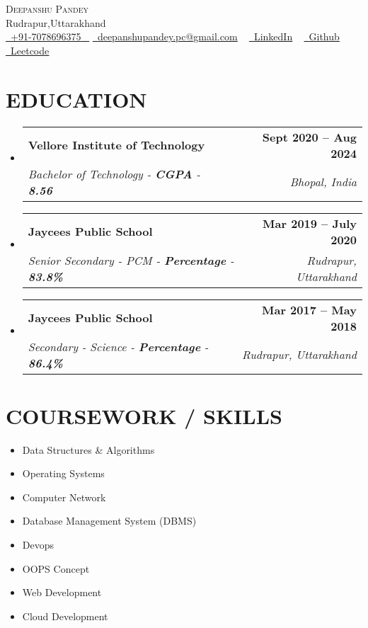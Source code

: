 \documentclass[letterpaper,11pt]{article}
\makeatletter
\newcommand{\resumeSubheading}[4]{
  \vspace{-2pt}\item
    \begin{tabular*}{1.0\textwidth}[t]{l@{\extracolsep{\fill}}r}
      \textbf{\large#1} & \textbf{\small #2} \\
      \textit{\large#3} & \textit{\small #4} \\
      
    \end{tabular*}\vspace{-7pt}
}
\newcommand{\resumeSubHeadingListStart}{\begin{itemize}[leftmargin=0.0in, label={}]}
\newcommand{\resumeSubHeadingListEnd}{\end{itemize}}
\makeatother
\begin{document}


\begin{center}
    {\Huge \scshape Deepanshu Pandey} \\ \vspace{1pt}
    Rudrapur,Uttarakhand \\ \vspace{1pt}
    \small \href{tel:+xxxxxxxxxxxx}{ \raisebox{-0.1\height}\faPhone\ \underline{+91-7078696375} ~} \href{mailto:deepanshupandey.pc@gmail.com}{\raisebox{-0.2\height}\faEnvelope\  \underline{deepanshupandey.pc@gmail.com}} ~ 
    \href{https://www.linkedin.com/in/deepanshupandey-/}{\raisebox{-0.2\height}\faLinkedinSquare\ \underline{LinkedIn}}  ~
    \href{https://github.com/deepanshu-byte}{\raisebox{-0.2\height}\faGithub\ \underline{Github}} ~
    \href{https://leetcode.com/deepanshu_pandey/}{\raisebox{-0.2\height}\faCode\ \underline{Leetcode}}
    \vspace{-8pt}
\end{center}


\section{EDUCATION}
  \resumeSubHeadingListStart
    \resumeSubheading
      {Vellore Institute of Technology}{Sept 2020 -- Aug 2024}
      {Bachelor of Technology - \textbf{CGPA} - \textbf{8.56}}{Bhopal, India}
  \resumeSubHeadingListEnd
  
  \resumeSubHeadingListStart
    \resumeSubheading
      {Jaycees Public School}{Mar 2019 -- July 2020 }
      {Senior Secondary - PCM  - \textbf{Percentage} - \textbf{83.8\%}}{Rudrapur, Uttarakhand}
  \resumeSubHeadingListEnd
  \resumeSubHeadingListStart
    \resumeSubheading
      {Jaycees Public School}{Mar 2017 -- May 2018 }
      {Secondary - Science  - \textbf{Percentage} - \textbf{86.4\%}}{Rudrapur, Uttarakhand}
  \resumeSubHeadingListEnd
\section{COURSEWORK / SKILLS}
        \begin{multicols}{4}
            \begin{itemize}[itemsep=-2pt, parsep=5pt]
                \item Data Structures \& Algorithms
                \item Operating Systems
                \item Computer Network 
                \item Database Management System (DBMS)
                \item Devops
                \item OOPS Concept
                \item Web Development
                \item Cloud Development
            \end{itemize}
        \end{multicols}
        \vspace*{2.0\multicolsep}
\end{document}
